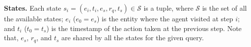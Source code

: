 \documentclass[11pt,a4paper]{article}
\begin{document}
{\bf States.} Each state $s_{i} = (e_{i}, t_{i}, e_{s}, r_{q},t_{s}) \in
\mathcal{S} $ is a tuple, where $\mathcal{S}$ is the set of all the available
states; $e_{i}$ ($e_0=e_s$) is the entity where the agent visited at step $i$; and
$t_{i}$ ($t_0=t_s$) is the timestamp of the action taken at the previous step. Note that,
$e_{s}$, $r_{q}$, and $t_{s}$ are shared by all the states for the given query.
\end{document}
